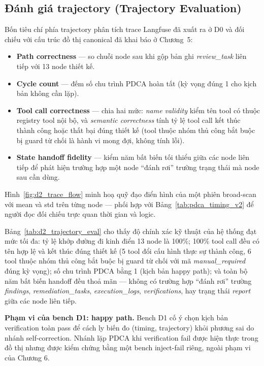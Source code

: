 \subsection{Đánh giá trajectory (Trajectory Evaluation)}
\label{subsec:trajectory_eval}

Bốn tiêu chí phía trajectory phân tích trace Langfuse đã xuất ra ở D0 và đối chiếu với cấu trúc đồ thị canonical đã khai báo ở Chương~5:
\begin{itemize}
  \item \textbf{Path correctness} --- so chuỗi node sau khi gộp bản ghi \textit{review\_task} liên tiếp với 13 node thiết kế.
  \item \textbf{Cycle count} --- đếm số chu trình PDCA hoàn tất (kỳ vọng đúng 1 cho kịch bản không cần lặp).
  \item \textbf{Tool call correctness} --- chia hai mức: \emph{name validity} kiểm tên tool có thuộc registry tool nội bộ, và \emph{semantic correctness} tính tỷ lệ tool call kết thúc thành công hoặc thất bại đúng thiết kế (tool thuộc nhóm thủ công bắt buộc bị guard từ chối là hành vi mong đợi, không tính lỗi).
  \item \textbf{State handoff fidelity} --- kiểm năm bất biến tối thiểu giữa các node liên tiếp để phát hiện trường hợp một node ``đánh rơi'' trường trạng thái mà node sau cần dùng.
\end{itemize}

Hình~\ref{fig:d2_trace_flow} minh hoạ quỹ đạo điển hình của một phiên broad-scan với mean và std trên từng node --- phối hợp với Bảng~\ref{tab:pdca_timing_v2} để người đọc đối chiếu trực quan thời gian và logic.





Bảng~\ref{tab:d2_trajectory_eval} cho thấy độ chính xác kỹ thuật của hệ thống đạt mức tối đa: tỷ lệ khớp đường đi kinh điển 13 node là 100\%; 100\% tool call đều có tên hợp lệ và kết thúc đúng thiết kế (5 tool đổi cấu hình thực sự thành công, 6 tool thuộc nhóm thủ công bắt buộc bị guard từ chối với mã \textit{manual\_required} đúng kỳ vọng); số chu trình PDCA bằng 1 (kịch bản happy path); và toàn bộ năm bất biến handoff đều thoả mãn --- không có trường hợp ``đánh rơi'' trường \textit{findings}, \textit{remediation\_tasks}, \textit{execution\_logs}, \textit{verifications}, hay trạng thái \textit{report} giữa các node liên tiếp.

\textbf{Phạm vi của bench D1: happy path.} Bench D1 cố ý chọn kịch bản verification toàn pass để cách ly biến đo (timing, trajectory) khỏi phương sai do nhánh self-correction. Nhánh lặp PDCA khi verification fail được hiện thực trong đồ thị nhưng được kiểm chứng bằng một bench inject-fail riêng, ngoài phạm vi của Chương 6.

